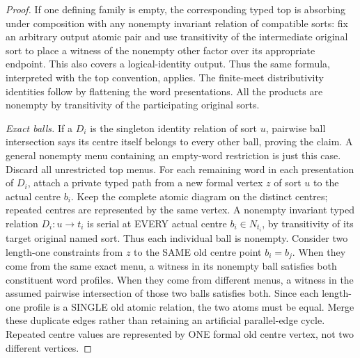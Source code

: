 \begin{proof}
If one defining family is empty, the corresponding typed top
is absorbing under composition with any nonempty invariant
relation of compatible sorts: fix an arbitrary output atomic
pair and use transitivity of the intermediate original sort to
place a witness of the nonempty other factor over its appropriate
endpoint. This also covers a logical-identity output. Thus the
same formula, interpreted with the top convention, applies. The
finite-meet distributivity identities follow by flattening the
word presentations. All the products are nonempty by transitivity
of the participating original sorts.

\emph{Exact balls.} If a $D_i$ is the singleton identity relation
of sort $u$, pairwise ball intersection says its centre itself
belongs to every other ball, proving the claim. A general
nonempty menu containing an empty-word restriction is just this
case. Discard all unrestricted top menus. For each remaining
word in each presentation of $D_i$, attach a private typed
path from a new formal vertex $z$ of sort $u$ to the actual
centre $b_i$. Keep the complete atomic diagram on the distinct
centres; repeated centres are represented by the same vertex.
A nonempty invariant typed relation \(D_i:u\to t_i\)
is serial at EVERY actual centre \(b_i\in N_{t_i}\),
by transitivity of its target original named sort.
Thus each individual ball is nonempty.
Consider two length-one constraints from \(z\)
to the SAME old centre point \(b_i=b_j\).
When they come from the same exact menu,
a witness in its nonempty ball satisfies
both constituent word profiles. When they
come from different menus, a witness in the
assumed pairwise intersection of those two
balls satisfies both. Since each length-one
profile is a SINGLE old atomic relation,
the two atoms must be equal. Merge these
duplicate edges rather than retaining
an artificial parallel-edge cycle.
Repeated centre values are represented by
ONE formal old centre vertex, not two
different vertices.


\end{proof}
